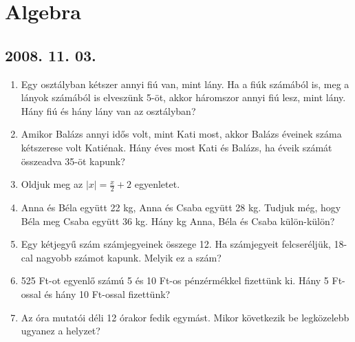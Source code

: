 \documentclass{article}
\begin{document}
\section*{Algebra}





\subsection*{2008. 11. 03.}
\begin{enumerate}
\item Egy osztályban kétszer annyi fiú van, mint lány. Ha a fiúk számából is, meg a lányok számából is elveszünk 5-öt, akkor háromszor annyi fiú lesz, mint lány. Hány fiú és hány lány van az osztályban?
\item Amikor Balázs annyi idős volt, mint Kati most, akkor Balázs éveinek száma kétszerese volt Katiénak. Hány éves most Kati és Balázs, ha éveik számát összeadva 35-öt kapunk?
\item Oldjuk meg az $|x|=\displaystyle{\frac{x}{2}}+2$ egyenletet.
\item Anna és Béla együtt 22 kg, Anna és Csaba együtt 28 kg. Tudjuk még, hogy Béla meg Csaba együtt 36 kg. Hány kg Anna, Béla és Csaba külön-külön?
\item Egy kétjegyű szám számjegyeinek összege 12. Ha számjegyeit felcseréljük, 18-cal nagyobb számot kapunk. Melyik ez a szám?
\item 525 Ft-ot egyenlő számú 5 és 10 Ft-os pénzérmékkel fizettünk ki. Hány 5 Ft-ossal és hány 10 Ft-ossal fizettünk?
\item Az óra mutatói déli 12 órakor fedik egymást. Mikor következik be legközelebb ugyanez a helyzet?
\end{enumerate}
\end{document}

